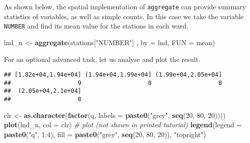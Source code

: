 \documentclass[]{article}
\newenvironment{Shaded}{}{}
\newcommand{\KeywordTok}[1]{\textcolor[rgb]{0.00,0.44,0.13}{\textbf{{#1}}}}
\newcommand{\DataTypeTok}[1]{\textcolor[rgb]{0.56,0.13,0.00}{{#1}}}
\newcommand{\DecValTok}[1]{\textcolor[rgb]{0.25,0.63,0.44}{{#1}}}
\newcommand{\StringTok}[1]{\textcolor[rgb]{0.25,0.44,0.63}{{#1}}}
\newcommand{\CommentTok}[1]{\textcolor[rgb]{0.38,0.63,0.69}{\textit{{#1}}}}
\newcommand{\NormalTok}[1]{{#1}}
\begin{document}
\begin{Shaded}
\end{Shaded}

As shown below, the spatial implementation of \texttt{aggregate} can
provide summary statistics of variables, as well as simple counts. In
this case we take the variable \texttt{NUMBER} and find its mean value
for the stations in each ward.

\begin{Shaded}
\begin{Highlighting}[]
\NormalTok{lnd_n <-}\StringTok{ }\KeywordTok{aggregate}\NormalTok{(stations[}\StringTok{"NUMBER"}\NormalTok{] , }\DataTypeTok{by =} \NormalTok{lnd, }\DataTypeTok{FUN =} \NormalTok{mean)}
\end{Highlighting}
\end{Shaded}

For an optional advanced task, let us analyse and plot the result.

\begin{Shaded}
\end{Shaded}

\begin{verbatim}
## [1.82e+04,1.94e+04] (1.94e+04,1.99e+04] (1.99e+04,2.05e+04] 
##                   9                   8                   8 
##  (2.05e+04,2.1e+04] 
##                   8
\end{verbatim}

\begin{Shaded}
\begin{Highlighting}[]
\NormalTok{clr <-}\StringTok{ }\KeywordTok{as.character}\NormalTok{(}\KeywordTok{factor}\NormalTok{(q, }\DataTypeTok{labels =} \KeywordTok{paste0}\NormalTok{(}\StringTok{"grey"}\NormalTok{, }\KeywordTok{seq}\NormalTok{(}\DecValTok{20}\NormalTok{, }\DecValTok{80}\NormalTok{, }\DecValTok{20}\NormalTok{))))}
\KeywordTok{plot}\NormalTok{(lnd_n, }\DataTypeTok{col =} \NormalTok{clr) }\CommentTok{# plot (not shown in printed tutorial)}
\KeywordTok{legend}\NormalTok{(}\DataTypeTok{legend =} \KeywordTok{paste0}\NormalTok{(}\StringTok{"q"}\NormalTok{, }\DecValTok{1}\NormalTok{:}\DecValTok{4}\NormalTok{), }\DataTypeTok{fill =} \KeywordTok{paste0}\NormalTok{(}\StringTok{"grey"}\NormalTok{, }\KeywordTok{seq}\NormalTok{(}\DecValTok{20}\NormalTok{, }\DecValTok{80}\NormalTok{, }\DecValTok{20}\NormalTok{)), }\StringTok{"topright"}\NormalTok{)}
\end{Highlighting}
\end{Shaded}
\end{document}
